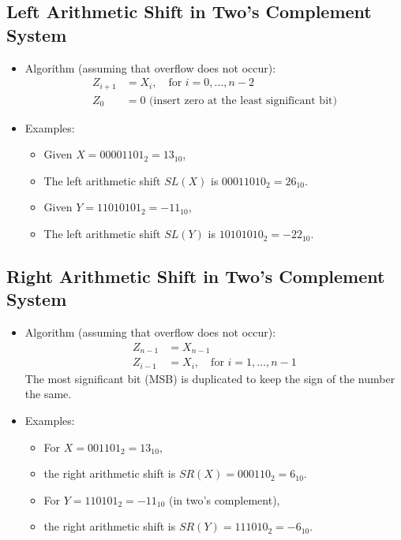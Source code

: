\documentclass[12pt,openany]{book}
\begin{document}
	\newpage
	\subsection{Left Arithmetic Shift in Two's Complement System}
	
	\begin{itemize}
		\item[] Algorithm (assuming that overflow does not occur):
			  \begin{align*}
				  Z_{i+1} & = X_{i}, \quad \text{for } i = 0, \ldots, n-2          \\
				  Z_{0}   & = 0 \text{ (insert zero at the least significant bit)} 
			  \end{align*}
		\item[] Examples:
			  \begin{itemize}
				  \item[] Given \( X = 00001101_2 = 13_{10} \),
				  \item[] The left arithmetic shift \( SL(X) \) is \(00011010_2 = 26_{10} \).
				  \item[] Given \( Y = 11010101_2 = -11_{10} \),
				  \item[] The left arithmetic shift \( SL(Y) \) is \( 10101010_2 = -22_{10} \).
			  \end{itemize}
	\end{itemize}
	
	
	
	
	\subsection{Right Arithmetic Shift in Two's Complement System}
	
	
	\begin{itemize}
		\item[] Algorithm (assuming that overflow does not occur):
		      \begin{align*}
		      	Z_{n-1} & = X_{n-1}                                   \\
		      	Z_{i-1} & = X_i, \quad \text{for } i = 1, \ldots, n-1 
		      \end{align*}
		      The most significant bit (MSB) is duplicated to keep the sign of the number the same.
		\item[] Examples:
		      \begin{itemize}
		      	\item[] For $X = 001101_2 = 13_{10}$,
				\item[] the right arithmetic shift is $SR(X) = 000110_2 = 6_{10}$.
		      	\item[] For $Y = 110101_2 = -11_{10}$ (in two's complement),
				\item[] the right arithmetic shift is $SR(Y) = 111010_2 = -6_{10}$.
		      \end{itemize}
	\end{itemize}
	
\end{document}
